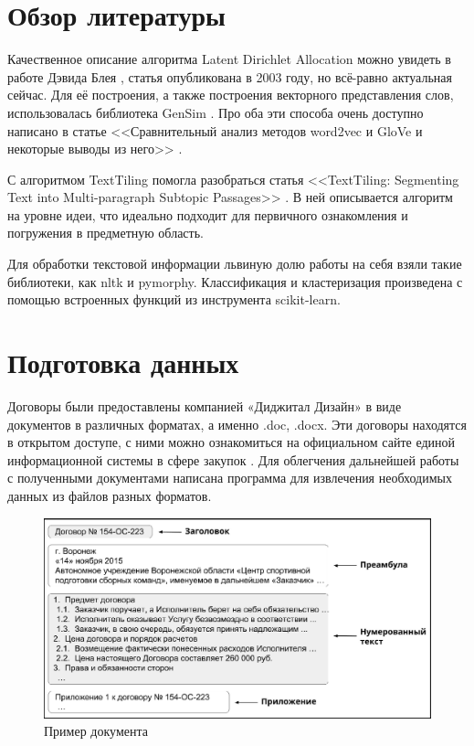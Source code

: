 \documentclass[12pt]{article}
\begin{document}
\newpage
\section{Обзор литературы}
Качественное описание алгоритма Latent Dirichlet Allocation можно увидеть в работе Дэвида Блея \cite{lda}, статья опубликована в 2003 году, но всё-равно актуальная сейчас. Для её построения, а также построения векторного представления слов, использовалась библиотека GenSim \cite{gensim}. Про оба эти способа очень доступно написано в статье <<Сравнительный анализ методов word2vec и GloVe и некоторые выводы из него>> \cite{maslovskaya}.

С алгоритмом TextTiling помогла разобраться статья <<TextTiling: \linebreak Segmenting Text into Multi-paragraph Subtopic Passages>> \cite{texttiling}. В ней описывается алгоритм на уровне идеи, что идеально подходит для первичного ознакомления и погружения в предметную область. 

Для обработки текстовой информации львиную долю работы на себя взяли такие библиотеки, как nltk и pymorphy. Классификация и кластеризация произведена с помощью встроенных функций из инструмента scikit-learn.


\newpage
\section{Подготовка данных}
Договоры были предоставлены компанией «Диджитал Дизайн» \cite{dd} в виде документов в различных форматах, а именно .doc, .docx. Эти договоры находятся в открытом доступе, с ними можно ознакомиться на официальном сайте единой информационной системы в сфере закупок \cite{zakupki}. Для облегчения дальнейшей работы с полученными документами написана программа для извлечения необходимых данных из файлов разных форматов. 

\vspace{5pt}
\begin{figure}[h]
	\includegraphics[scale=0.74]{images/im1.eps}
	\caption{Пример документа}
	\label{im1}
\end{figure}
\vspace{5pt}
\end{document}

